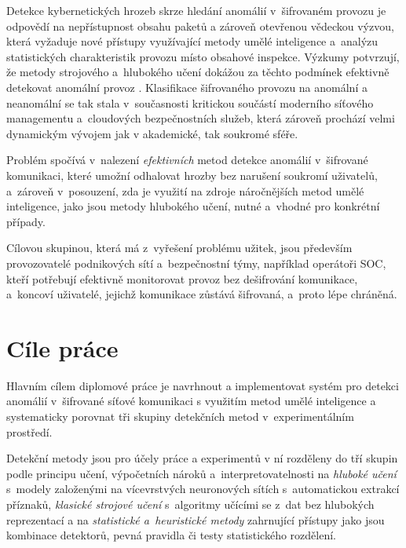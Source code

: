 Detekce kybernetických hrozeb skrze hledání anomálií v~šifrovaném provozu je odpovědí na nepřístupnost obsahu paketů a zároveň otevřenou vědeckou výzvou, která vyžaduje nové přístupy využívající metody umělé inteligence a~analýzu statistických charakteristik provozu místo obsahové inspekce. Výzkumy potvrzují, že metody strojového a~hlubokého učení dokážou za těchto podmínek efektivně detekovat anomální provoz \parencite{Almuhammadi2025}. Klasifikace šifrovaného provozu na anomální a neanomální se tak stala v~současnosti kritickou součástí moderního síťového managementu a~cloudových bezpečnostních služeb, která zároveň prochází velmi dynamickým vývojem jak v akademické, tak soukromé sféře.

Problém spočívá v~nalezení \emph{efektivních} metod detekce anomálií v~šifrované komunikaci, které umožní odhalovat hrozby bez narušení soukromí uživatelů, a~zároveň v~posouzení, zda je využití na zdroje náročnějších metod umělé inteligence, jako jsou metody hlubokého učení, nutné a~vhodné pro konkrétní případy.

Cílovou skupinou, která má z~vyřešení problému užitek, jsou především provozovatelé podnikových sítí a~bezpečnostní týmy, například operátoři SOC, kteří potřebují efektivně monitorovat provoz bez dešifrování komunikace, a~koncoví uživatelé, jejichž komunikace zůstává šifrovaná, a~proto lépe chráněná.

\section*{Cíle práce}

Hlavním cílem diplomové práce je navrhnout a implementovat systém pro detekci anomálií v~šifrované síťové komunikaci s využitím metod umělé inteligence a systematicky porovnat tři skupiny detekčních metod v~experimentálním prostředí.

Detekční metody jsou pro účely práce a experimentů v ní rozděleny do tří skupin podle principu učení, výpočetních nároků a~interpretovatelnosti na \emph{hluboké učení} s~modely založenými na vícevrstvých neuronových sítích s~automatickou extrakcí příznaků, \emph{klasické strojové učení} s~algoritmy učícími se z~dat bez hlubokých reprezentací a na \emph{statistické a~heuristické metody} zahrnující přístupy jako jsou kombinace detektorů, pevná pravidla či testy statistického rozdělení.

